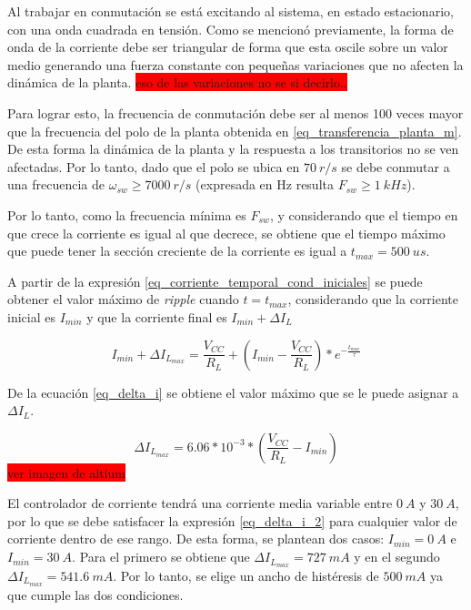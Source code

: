 Al trabajar en conmutación se está excitando al sistema, en estado estacionario, con una onda cuadrada en tensión. Como se mencionó previamente, la forma de onda de la corriente debe ser triangular de forma que esta oscile sobre un valor medio generando una fuerza constante con pequeñas variaciones que no afecten la dinámica de la planta.
\colorbox{red}{eso de las variaciones no se si decirlo..}

Para lograr esto, la frecuencia de conmutación debe ser al menos 100 veces mayor que la frecuencia del polo de la planta obtenida en \ref{eq_transferencia_planta_m}.
De esta forma la dinámica de la planta y la respuesta a los transitorios no se ven afectadas.  Por lo tanto, dado que el polo se ubica en $70\:r/s$  se debe conmutar a una frecuencia de $\omega_{sw}\geq7000\:r/s$ (expresada en Hz resulta $F_{sw}\geq1\:kHz$).

Por lo tanto, como la frecuencia mínima es $F_{sw}$, y considerando que el tiempo en que crece la corriente es igual al que decrece, se obtiene que el tiempo máximo que puede tener la sección creciente de la corriente es igual a $t_{max}=500\:us$. 

A partir de la expresión \ref{eq_corriente_temporal_cond_iniciales} se puede obtener el valor máximo de \textsl{ripple} cuando $t=t_{max}$, considerando que la corriente inicial es $I_{min}$ y que la corriente final es $I_{min}+\Delta I_L$

\begin{equation} \label{eq_delta_i}
	I_{min}+\Delta I_{L_{max}}=\frac{V_{CC}}{R_L}+(I_{min}-\frac{V_{CC}}{R_L})*e^{-\frac{t_{max}}{\tau}}
\end{equation}

De la ecuación \ref{eq_delta_i} se obtiene el valor máximo que se le puede asignar a $\Delta I_L$. 

\begin{equation} \label{eq_delta_i_2}
	\Delta I_{L_{max}}=6.06*10^{-3}*(\frac{V_{CC}}{R_L}-I_{min})
\end{equation}
\colorbox{red}{ver imagen de altium}

El controlador de corriente tendrá una corriente media variable entre $0\:A$ y $30\:A$, por lo que se debe satisfacer la expresión \ref{eq_delta_i_2} para cualquier valor de corriente dentro de ese rango. De esta forma, se plantean dos casos: $I_{min}=0\:A$ e $I_{min}=30\:A$. Para el primero se obtiene que $\Delta I_{L_{max}}=727\:mA$ y en el segundo $\Delta I_{L_{max}}=541.6\:mA$. Por lo tanto, se elige un ancho de histéresis de $500\:mA$ ya que cumple las dos condiciones.

